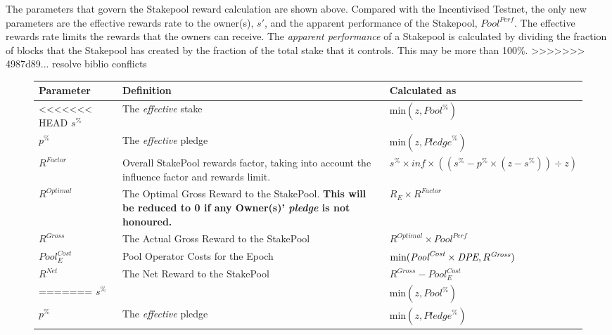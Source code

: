 \documentclass[11pt,a4paper,dvipsnames,twosided,final]{article}
\begin{document}
\noindent
The parameters that govern the Stakepool reward calculation are shown above.  Compared with the Incentivised
Testnet, the only new parameters are the effective rewards rate to the owner(s), $s'$, and the apparent performance of the Stakepool, $\textit{Pool}^{\textit{Perf}}$.
The effective rewards rate limits the rewards that the owners can receive.  The \emph{apparent performance} of a Stakepool is calculated
by dividing the fraction of blocks that the Stakepool has created by the fraction of the total stake that it controls.  This may be more than 100\%.
>>>>>>> 4987d89... resolve biblio conflicts

\begin{figure}[h!]
\begin{center}
\begin{tabular}{||l|p{6cm}|l||}
  \hline \hline
  \textbf{Parameter}  & \textbf{Definition} & \textbf{Calculated as} \\\hline
<<<<<<< HEAD
  $s^\%$ & The \emph{effective} stake & $\textrm{min} (z,{\textit{Pool}}^\%)$ \\\hline
  $p^\%$ & The \emph{effective} pledge  & $\textrm{min} (z,{\textit{Pledge}}^\%) $ \\\hline
  $\textit{R}^\textit{Factor}$ & Overall StakePool rewards factor, taking into account the influence factor and rewards limit. & $s^\% \times \textit{inf} \times ((s^\% - p^\% \times (z - s^\%)) \div z)$ \\\hline
  $R^{Optimal}$ & The Optimal Gross Reward to the StakePool.  \textbf{This will be reduced to 0 if any Owner(s)' \emph{pledge} is not honoured.} & $R_E \times \textit{R}^{Factor}$ \\\hline
$R^{\textit{Gross}}$ & The Actual Gross Reward to the StakePool & $R^{Optimal} \times \textit{Pool}^{\textit{Perf}}$ \\\hline
${\textit{Pool}}^{\textit{Cost}}_E$ & Pool Operator Costs for the Epoch & $\textrm{min}(\textit{\textit{Pool}}^{\textit{Cost}} \times \textit{DPE},R^{\textit{Gross}})$ \\\hline
$R^{\textit{Net}}$  & The Net Reward to the StakePool & $R^{\textit{Gross}} - {\textit{Pool}}^{\textit{Cost}}_E$ \\\hline
=======
  $s^\%$ &  & $\textrm{min} (z,{\textit{Pool}}^\%)$ \\\hline
  $p^\%$ & The \emph{effective} pledge  & $\textrm{min} (z,{\textit{Pledge}}^\%) $ \\\hline

\end{tabular}
\end{center}
\end{figure}
\end{document}
